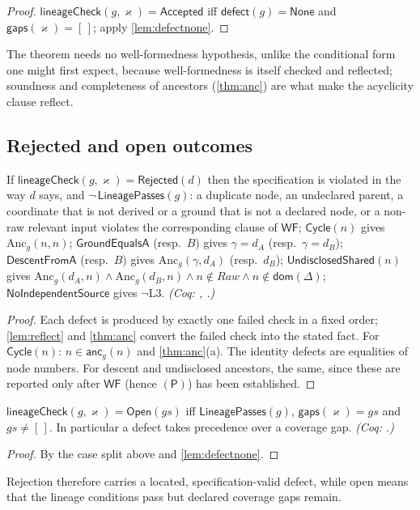 \begin{proof}
$\mathsf{lineageCheck}(g,\varkappa) = \mathsf{Accepted}$ iff $\mathsf{defect}(g) = \mathsf{None}$ and $\mathsf{gaps}(\varkappa) = [\,]$; apply \cref{lem:defectnone}.
\end{proof}
The theorem needs no well-formedness hypothesis, unlike the conditional form one might first expect, because well-formedness is itself checked and reflected; soundness and completeness of ancestors (\cref{thm:anc}) are what make the acyclicity clause reflect.

\subsection{Rejected and open outcomes}
\begin{prop}\label{prop:rejection}
If $\mathsf{lineageCheck}(g,\varkappa) = \mathsf{Rejected}(d)$ then the specification is violated in the way $d$ says, and $\neg\,\mathsf{LineagePasses}(g)$: a duplicate node, an undeclared parent, a coordinate that is not derived or a ground that is not a declared node, or a non-raw relevant input violates the corresponding clause of $\mathsf{WF}$; $\mathsf{Cycle}(n)$ gives $\mathrm{Anc}_g(n,n)$; $\mathsf{GroundEqualsA}$ (resp.\ $B$) gives $\gamma = d_A$ (resp.\ $\gamma = d_B$); $\mathsf{DescentFromA}$ (resp.\ $B$) gives $\mathrm{Anc}_g(\gamma,d_A)$ (resp.\ $d_B$); $\mathsf{UndisclosedShared}(n)$ gives $\mathrm{Anc}_g(d_A,n) \wedge \mathrm{Anc}_g(d_B,n) \wedge n \notin \mathit{Raw} \wedge n \notin \mathsf{dom}(\Delta)$; $\mathsf{NoIndependentSource}$ gives $\neg\mathrm{L3}$. \emph{(Coq: , .)}
\end{prop}
\begin{proof}
Each defect is produced by exactly one failed check in a fixed order; \cref{lem:reflect} and \cref{thm:anc} convert the failed check into the stated fact. For $\mathsf{Cycle}(n)$: $n \in \mathsf{anc}_g(n)$ and \cref{thm:anc}(a). The identity defects are equalities of node numbers. For descent and undisclosed ancestors, the same, since these are reported only after $\mathsf{WF}$ (hence $(\mathsf{P})$) has been established.
\end{proof}
\begin{prop}\label{prop:openlineage}
$\mathsf{lineageCheck}(g,\varkappa) = \mathsf{Open}(\mathit{gs})$ iff $\mathsf{LineagePasses}(g)$, $\mathsf{gaps}(\varkappa) = \mathit{gs}$ and $\mathit{gs} \neq [\,]$. In particular a defect takes precedence over a coverage gap. \emph{(Coq: .)}
\end{prop}
\begin{proof}
By the case split above and \cref{lem:defectnone}.
\end{proof}
Rejection therefore carries a located, specification-valid defect, while open means that the lineage conditions pass but declared coverage gaps remain.

